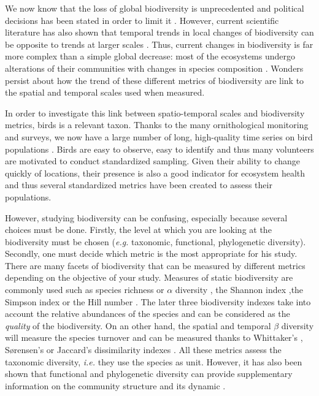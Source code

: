 \documentclass[
  12pt,
  oneside]{report}
\begin{document}
We now know that the loss of global biodiversity is unprecedented and political decisions has been stated in order to limit it \citep[\emph{e.g.}][2010, 2002]{the_convention_on_biological_diversity_convention_2021}. However, current scientific literature has also shown that temporal trends in local changes of biodiversity can be opposite to trends at larger scales \citep[\emph{e.g.}][]{chase_species_2019}. Thus, current changes in biodiversity is far more complex than a simple global decrease: most of the ecosystems undergo alterations of their communities with changes in species composition \citep{blowes_geography_2019, dornelas_quantifying_2013}. Wonders persist about how the trend of these different metrics of biodiversity are link to the spatial and temporal scales used when measured.

In order to investigate this link between spatio-temporal scales and biodiversity metrics, birds is a relevant taxon. Thanks to the many ornithological monitoring and surveys, we now have a large number of long, high-quality time series on bird populations \citep{bejcek_velke_2016, sauer_north_2013, kamp_population_2021}. Birds are easy to observe, easy to identify and thus many volunteers are motivated to conduct standardized sampling. Given their ability to change quickly of locations, their presence is also a good indicator for ecosystem health and thus several standardized metrics have been created to assess their populations.

However, studying biodiversity can be confusing, especially because several choices must be done. Firstly, the level at which you are looking at the biodiversity must be chosen (\emph{e.g.} taxonomic, functional, phylogenetic diversity). Secondly, one must decide which metric is the most appropriate for his study. There are many facets of biodiversity that can be measured by different metrics depending on the objective of your study. Measures of static biodiversity are commonly used such as species richness or \(\alpha\) diversity \citep[\emph{i.e.} number of species,][]{whittaker_vegetation_1960}, the Shannon index \citep{shannon_mathematical_1948} ,the Simpson index \citep{simpson_measurement_1949} or the Hill number \citep{hill_diversity_1973}. The later three biodiversity indexes take into account the relative abundances of the species and can be considered as the \emph{quality} of the biodiversity. On an other hand, the spatial and temporal \(\beta\) diversity will measure the species turnover and can be measured thanks to Whittaker's \citep{whittaker_evolution_1972}, Sørensen's \citep{sorensen_method_1948} or Jaccard's \citep{jaccard_distribution_1912} dissimilarity indexes \citep[\emph{e.g.}][]{keil_patterns_2012}. All these metrics assess the taxonomic diversity, \emph{i.e.} they use the species as unit. However, it has also been shown that functional and phylogenetic diversity can provide supplementary information on the community structure and its dynamic \citep[\emph{e.g.}][]{mcgill_rebuilding_2006, mouquet_ecophylogenetics_2012, webb_phylogenies_2002}.
\end{document}
